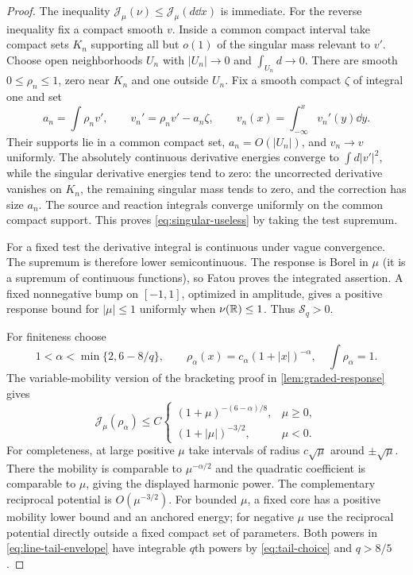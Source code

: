 \begin{proof}
The inequality $\mathscr J_\mu(\nu)\le\mathscr J_\mu(d\dd x)$ is
immediate. For the reverse inequality fix a compact smooth $v$.
Inside a common compact interval take compact sets $K_n$ supporting
all but $o(1)$ of the singular mass relevant to $v'$. Choose open
neighborhoods $U_n$ with $|U_n|\to0$ and $\int_{U_n}d\to0$.
There are smooth $0\le\rho_n\le1$, zero near $K_n$ and one outside
$U_n$. Fix a smooth compact $\zeta$ of integral one and set
\[
 a_n=\int\rho_nv',\qquad v_n'=\rho_nv'-a_n\zeta,
 \qquad v_n(x)=\int_{-\infty}^xv_n'(y)\dd y.
\]
Their supports lie in a common compact set, $a_n=O(|U_n|)$,
and $v_n\to v$ uniformly. The absolutely continuous derivative
energies converge to $\int d|v'|^2$, while the singular derivative
energies tend to zero: the uncorrected derivative vanishes on $K_n$,
the remaining singular mass tends to zero, and the correction has
size $a_n$. The source and reaction integrals converge uniformly
on the common compact support. This proves \eqref{eq:singular-useless}
by taking the test supremum.

For a fixed test the derivative integral is continuous under vague
convergence. The supremum is therefore lower semicontinuous. The
response is Borel in $\mu$ (it is a supremum of continuous functions),
so Fatou proves the integrated assertion. A fixed nonnegative bump
on $[-1,1]$, optimized in amplitude, gives a positive response bound
for $|\mu|\le1$ uniformly when $\nu(\mathbb R)\le1$. Thus
$\mathcal S_q>0$.

For finiteness choose
\begin{equation}\label{eq:tail-choice}
 1<\alpha<\min\{2,6-8/q\},\qquad
 \rho_\alpha(x)=c_\alpha(1+|x|)^{-\alpha},\quad\int\rho_\alpha=1.
\end{equation}
The variable-mobility version of the bracketing proof in
\cref{lem:graded-response} gives
\begin{equation}\label{eq:line-tail-envelope}
 \mathscr J_\mu(\rho_\alpha)\le C
 \begin{cases}
 (1+\mu)^{-(6-\alpha)/8},&\mu\ge0,\\
 (1+|\mu|)^{-3/2},&\mu<0.
 \end{cases}
\end{equation}
For completeness, at large positive $\mu$ take intervals of radius
$c\sqrt\mu$ around $\pm\sqrt\mu$. There the mobility is comparable
to $\mu^{-\alpha/2}$ and the quadratic coefficient is comparable
to $\mu$, giving the displayed harmonic power. The complementary
reciprocal potential is $O(\mu^{-3/2})$. For bounded $\mu$, a fixed
core has a positive mobility lower bound and an anchored energy;
for negative $\mu$ use the reciprocal potential directly outside
a fixed compact set of parameters. Both powers in
\eqref{eq:line-tail-envelope} have integrable $q$th powers by
\eqref{eq:tail-choice} and $q>8/5$.


\end{proof}
